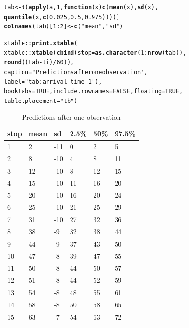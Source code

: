 \documentclass[11pt]{article}\usepackage[]{graphicx}\usepackage[]{color}
\makeatletter
\newcommand{\hlnum}[1]{\textcolor[rgb]{0.686,0.059,0.569}{#1}}%
\newcommand{\hlstr}[1]{\textcolor[rgb]{0.192,0.494,0.8}{#1}}%
\newcommand{\hlopt}[1]{\textcolor[rgb]{0,0,0}{#1}}%
\newcommand{\hlstd}[1]{\textcolor[rgb]{0.345,0.345,0.345}{#1}}%
\newcommand{\hlkwa}[1]{\textcolor[rgb]{0.161,0.373,0.58}{\textbf{#1}}}%
\newcommand{\hlkwb}[1]{\textcolor[rgb]{0.69,0.353,0.396}{#1}}%
\newcommand{\hlkwc}[1]{\textcolor[rgb]{0.333,0.667,0.333}{#1}}%
\newcommand{\hlkwd}[1]{\textcolor[rgb]{0.737,0.353,0.396}{\textbf{#1}}}%
\newenvironment{kframe}{%
 \def\at@end@of@kframe{}%
 \ifinner\ifhmode%
  \def\at@end@of@kframe{\end{minipage}}%
  \begin{minipage}{\columnwidth}%
 \fi\fi%
 \def\FrameCommand##1{\hskip\@totalleftmargin \hskip-\fboxsep
 \colorbox{shadecolor}{##1}\hskip-\fboxsep
     \hskip-\linewidth \hskip-\@totalleftmargin \hskip\columnwidth}%
 \MakeFramed {\advance\hsize-\width
   \@totalleftmargin\z@ \linewidth\hsize
   \@setminipage}}%
 {\par\unskip\endMakeFramed%
 \at@end@of@kframe}
\makeatother
\begin{document}
\begin{kframe}
\begin{alltt}
\hlstd{tab} \hlkwb{<-} \hlkwd{t}\hlstd{(}\hlkwd{apply}\hlstd{(a,} \hlnum{1}\hlstd{,} \hlkwa{function}\hlstd{(}\hlkwc{x}\hlstd{)} \hlkwd{c}\hlstd{(}\hlkwd{mean}\hlstd{(x),} \hlkwd{sd}\hlstd{(x),}
                                   \hlkwd{quantile}\hlstd{(x,} \hlkwd{c}\hlstd{(}\hlnum{0.025}\hlstd{,} \hlnum{0.5}\hlstd{,} \hlnum{0.975}\hlstd{)))))}
\hlkwd{colnames}\hlstd{(tab)[}\hlnum{1}\hlopt{:}\hlnum{2}\hlstd{]} \hlkwb{<-} \hlkwd{c}\hlstd{(}\hlstr{"mean"}\hlstd{,} \hlstr{"sd"}\hlstd{)}

\hlstd{xtable}\hlopt{::}\hlkwd{print.xtable}\hlstd{(}
    \hlstd{xtable}\hlopt{::}\hlkwd{xtable}\hlstd{(}\hlkwd{cbind}\hlstd{(}\hlkwc{stop} \hlstd{=} \hlkwd{as.character}\hlstd{(}\hlnum{1}\hlopt{:}\hlkwd{nrow}\hlstd{(tab)),}
                         \hlkwd{round}\hlstd{((tab} \hlopt{-} \hlstd{ti)} \hlopt{/} \hlnum{60}\hlstd{)),}
                   \hlkwc{caption} \hlstd{=} \hlstr{"Predictions after one observation"}\hlstd{,}
                   \hlkwc{label} \hlstd{=} \hlstr{"tab:arrival_time_1"}\hlstd{),}
    \hlkwc{booktabs} \hlstd{=} \hlnum{TRUE}\hlstd{,} \hlkwc{include.rownames} \hlstd{=} \hlnum{FALSE}\hlstd{,} \hlkwc{floating} \hlstd{=} \hlnum{TRUE}\hlstd{,}
    \hlkwc{table.placement} \hlstd{=} \hlstr{"tb"}\hlstd{)}
\end{alltt}
\end{kframe}%
\begin{table}[tb]
\centering
\begin{tabular}{llllll}
  \toprule
stop & mean & sd & 2.5\% & 50\% & 97.5\% \\ 
  \midrule
1 & 2 & -11 & 0 & 2 & 5 \\ 
  2 & 8 & -10 & 4 & 8 & 11 \\ 
  3 & 12 & -10 & 8 & 12 & 15 \\ 
  4 & 15 & -10 & 11 & 16 & 20 \\ 
  5 & 20 & -10 & 16 & 20 & 24 \\ 
  6 & 25 & -10 & 21 & 25 & 29 \\ 
  7 & 31 & -10 & 27 & 32 & 36 \\ 
  8 & 38 & -9 & 32 & 38 & 44 \\ 
  9 & 44 & -9 & 37 & 43 & 50 \\ 
  10 & 47 & -8 & 39 & 47 & 55 \\ 
  11 & 50 & -8 & 44 & 50 & 57 \\ 
  12 & 51 & -8 & 44 & 52 & 59 \\ 
  13 & 54 & -8 & 48 & 55 & 61 \\ 
  14 & 58 & -8 & 50 & 58 & 65 \\ 
  15 & 63 & -7 & 54 & 63 & 72 \\ 
   \bottomrule
\end{tabular}
\caption{Predictions after one observation} 
\label{tab:arrival_time_1}
\end{table}
\end{document}
